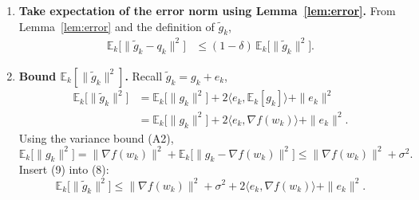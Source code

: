 \documentclass{article}
\newcommand{\E}{\mathbb{E}}
\begin{document}
\begin{enumerate}
\item[Step 7.] \textbf{Take expectation of the error norm using Lemma~\ref{lem:error}.}
From Lemma~\ref{lem:error} and the definition of $\tilde g_k$,
\begin{align}
\E_k\!\bigl[\|\tilde g_k-q_k\|^{2}\bigr]
&\le (1-\delta)\,\E_k\!\bigl[\|\tilde g_k\|^{2}\bigr].
\tag{7}
\end{align}
\item[Step 8.] \textbf{Bound $\E_k[\|\tilde g_k\|^{2}]$.}
Recall $\tilde g_k=g_k+e_k$,
\begin{align}
\E_k\!\bigl[\|\tilde g_k\|^{2}\bigr]
&= \E_k\!\bigl[\|g_k\|^{2}\bigr]+2\langle e_k,\E_k[g_k]\rangle+\|e_k\|^{2}\nonumber\\
&= \E_k\!\bigl[\|g_k\|^{2}\bigr]+2\langle e_k,\nabla f(w_k)\rangle+\|e_k\|^{2}.
\tag{8}
\end{align}
Using the variance bound (A2),
\[
\E_k\!\bigl[\|g_k\|^{2}\bigr]
= \|\nabla f(w_k)\|^{2}+\E_k\!\bigl[\|g_k-\nabla f(w_k)\|^{2}\bigr]
\le \|\nabla f(w_k)\|^{2}+\sigma^{2}.
\tag{9}
\]
Insert (9) into (8):
\[
\E_k\!\bigl[\|\tilde g_k\|^{2}\bigr]
\le \|\nabla f(w_k)\|^{2}+\sigma^{2}+2\langle e_k,\nabla f(w_k)\rangle+\|e_k\|^{2}.
\tag{10}
\]


\end{enumerate}
\end{document}
